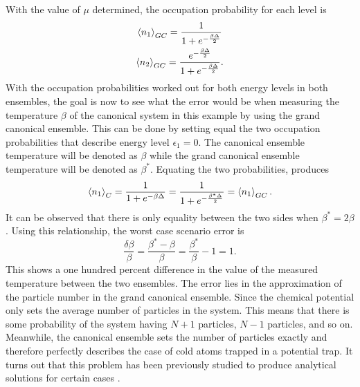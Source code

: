 With the value of $\mu$ determined, the occupation probability for each level is
\begin{gather}
    \left<{n_1}\right>_{GC}=\frac{1}{1+e^{-\frac{\beta\Delta}{2}}}\\
    \left<{n_2}\right>_{GC}=\frac{e^{-\frac{\beta\Delta}{2}}}{1+ e^{-\frac{\beta\Delta}{2}}}.
\end{gather}
With the occupation probabilities worked out for both energy levels in both ensembles, the goal is now to see what the error would be when measuring the temperature $\beta$ of the canonical system in this example by using the grand canonical ensemble. This can be done by setting equal the two occupation probabilities that describe energy level $\epsilon_1=0$. The canonical ensemble temperature will be denoted as $\beta$ while the grand canonical ensemble temperature will be denoted as $\beta^*$. 
Equating the two probabilities, produces 
\begin{gather}
    \left<{n_1}\right>_C=\frac{1}{1+e^{-\beta\Delta}}=\frac{1}{1+e^{-\frac{\beta^*\Delta}{2}}}=\left<{n_1}\right>_{GC}.
\end{gather}
It can be observed that there is only equality between the two sides when $\beta^*=2\beta$. Using this relationship, the worst case scenario error is
\begin{equation}
    \frac{\delta\beta}{\beta}=\frac{\beta^*-\beta}{\beta}=\frac{\beta^*}{\beta}-1=1.
\end{equation}
This shows a one hundred percent difference in the value of the measured temperature between the two ensembles. The error lies in the approximation of the particle number in the grand canonical ensemble. Since the chemical potential only sets the average number of particles in the system. This means that there is some probability of the system having $N+1$ particles, $N-1$ particles, and so on. Meanwhile, the canonical ensemble sets the number of particles exactly and therefore perfectly describes the case of cold atoms trapped in a potential trap. It turns out that this problem has been previously studied to produce analytical solutions for certain cases \cite{Hatem2020, Borr1993, Schon1996}.

